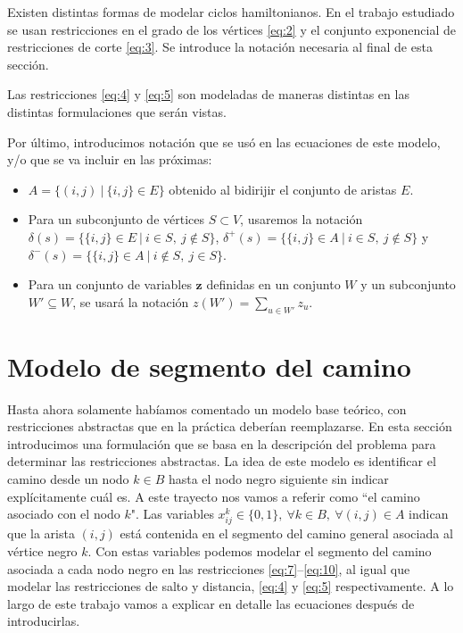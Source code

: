 \documentclass[10pt, a4paper]{article}
\theoremstyle{definition}
\begin{document}
Existen distintas formas de modelar ciclos hamiltonianos. En el trabajo estudiado se usan restricciones en el grado de los vértices \ref{eq:2} y el conjunto exponencial de restricciones de corte \ref{eq:3}. Se introduce la notación necesaria al final de esta sección.

Las restricciones \ref{eq:4} y \ref{eq:5} son modeladas de maneras distintas en las distintas formulaciones que serán vistas.

Por último, introducimos notación que se usó en las ecuaciones de este modelo, y/o que se va incluir en las próximas:

\begin{itemize}
	\item $A = \{(i,j)\ |\ \{i,j\} \in E\}$ obtenido al bidirijir el conjunto de aristas $E$.
	\item Para un subconjunto de vértices $S \subset V$, usaremos la notación $\delta(s) = \{\{i,j\} \in E\ |\ i \in S,\ j \notin S\}$,
$\delta^+(s) = \{\{i,j\} \in A\ |\ i \in S,\ j \notin S\}$ y $\delta^-(s) = \{\{i,j\} \in A\ |\ i \notin S,\ j \in S\}$.
	\item Para un conjunto de variables $\textbf{z}$ definidas en un conjunto $W$ y un subconjunto $W' \subseteq W$, se usará la notación $z(W') = \sum_{u \in W'} z_u$.
\end{itemize}

\section{Modelo de segmento del camino}

Hasta ahora solamente habíamos comentado un modelo base teórico, con restricciones abstractas que en la práctica deberían reemplazarse. En esta sección introducimos una formulación que se basa en la descripción del problema para determinar las restricciones abstractas. La idea de este modelo es identificar el camino desde un nodo $k \in B$ hasta el nodo negro siguiente sin indicar explícitamente cuál es. A este trayecto nos vamos a referir como “el camino asociado con el nodo $k$". Las variables $x_{i j}^{k} \in\{0,1\},\ \forall k \in B,\ \forall(i, j) \in A$ indican que la arista $(i,j)$ está contenida en el segmento del camino general asociada al vértice negro $k$. Con estas variables podemos modelar el segmento del camino asociada a cada nodo negro en las restricciones \ref{eq:7}–\ref{eq:10}, al igual que modelar las restricciones de salto y distancia, \ref{eq:4} y \ref{eq:5} respectivamente. A lo largo de este trabajo vamos a explicar en detalle las ecuaciones después de introducirlas.
\end{document}
